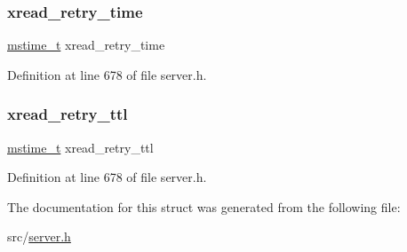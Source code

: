 \subsubsection{\texorpdfstring{xread\+\_\+retry\+\_\+time}{xread\_retry\_time}}
{\footnotesize\ttfamily \hyperlink{redismodule_8h_a652ae61e2475bc8957454534544968fc}{mstime\+\_\+t} xread\+\_\+retry\+\_\+time}



Definition at line 678 of file server.\+h.

\mbox{\label{structblocking_state_a7ee5bfe490a220cccc4c44fd5640a2b3}} 
\subsubsection{\texorpdfstring{xread\+\_\+retry\+\_\+ttl}{xread\_retry\_ttl}}
{\footnotesize\ttfamily \hyperlink{redismodule_8h_a652ae61e2475bc8957454534544968fc}{mstime\+\_\+t} xread\+\_\+retry\+\_\+ttl}



Definition at line 678 of file server.\+h.



The documentation for this struct was generated from the following file\+:\begin{DoxyCompactItemize}
\item 
src/\hyperlink{server_8h}{server.\+h}\end{DoxyCompactItemize}
